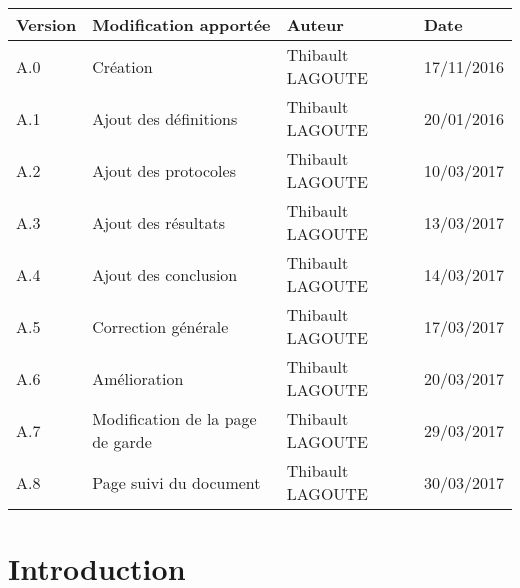 \documentclass[10pt,a4paper]{article}
\begin{document}
\begin{center}
    \begin{tabular}{| l | l | l | l |}
    \hline
     \rowcolor{gray} Version & Modification apportée & Auteur & Date \\ \hline
    A.0 & Création & Thibault LAGOUTE & 17/11/2016\\ \hline
    A.1 & Ajout des définitions & Thibault LAGOUTE & 20/01/2016\\ \hline
    A.2 & Ajout des protocoles & Thibault LAGOUTE & 10/03/2017\\ \hline
    A.3 & Ajout des résultats & Thibault LAGOUTE & 13/03/2017\\ \hline
    A.4 & Ajout des conclusion & Thibault LAGOUTE & 14/03/2017\\ \hline
    A.5 & Correction générale & Thibault LAGOUTE & 17/03/2017\\ \hline
    A.6 & Amélioration & Thibault LAGOUTE & 20/03/2017\\ \hline
    A.7 & Modification de la page de garde & Thibault LAGOUTE & 29/03/2017\\ \hline
    A.8 & Page suivi du document & Thibault LAGOUTE & 30/03/2017\\ \hline
    \end{tabular}
\end{center}



\makeatletter
\def\captionof#1#2{{\def\@captype{#1}#2}}
\makeatother

\newpage
\section{Introduction}
\end{document}
